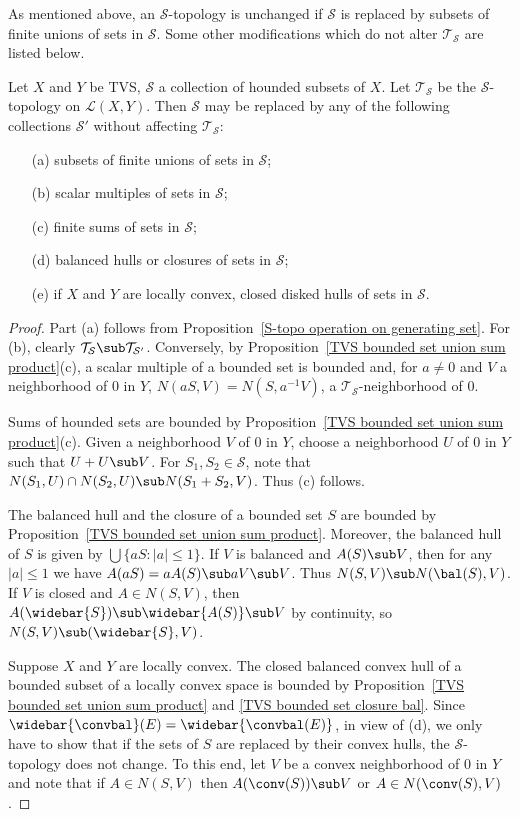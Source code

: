 As mentioned above, an $\mathcal{S}$-topology is unchanged if $\mathcal{S}$ is replaced by subsets of finite unions of sets in $\mathcal{S}$. Some other modifications which do not alter $\mathcal{T}_\mathcal{S}$ are listed below.
\begin{proposition}\label{S-topo on L(X,Y) operation on S}
Let $X$ and $Y$ be TVS, $\mathcal{S}$ a collection of hounded subsets of $X$. Let $\mathcal{T}_\mathcal{S}$ be the $\mathcal{S}$-topology on $\mathcal{L}(X,Y)$. Then $\mathcal{S}$ may be replaced by any of the following collections $\mathcal{S}'$ without affecting $\mathcal{T}_\mathcal{S}$:
\begin{itemize}
\item[(a)] subsets of finite unions of sets in $\mathcal{S}$;
\item[(b)] scalar multiples of sets in $\mathcal{S}$;
\item[(c)] finite sums of sets in $\mathcal{S}$;
\item[(d)] balanced hulls or closures of sets in $\mathcal{S}$;
\item[(e)] if $X$ and $Y$ are locally convex, closed disked hulls of sets in $\mathcal{S}$.
\end{itemize}
\end{proposition}
\begin{proof}
Part (a) follows from Proposition~\ref{S-topo operation on generating set}. For (b), clearly $\mathcal{T}_\mathcal{S}\sub\mathcal{T}_{\mathcal{S}'}$. Conversely, by Proposition~\ref{TVS bounded set union sum product}(c), a scalar multiple of a bounded set is bounded and, for $a\neq 0$ and $V$ a neighborhood of $0$ in $Y$, $N(aS,V)=N(S,a^{-1}V)$, a $\mathcal{T}_\mathcal{S}$-neighborhood of $0$.\par
Sums of hounded sets are bounded by Proposition~\ref{TVS bounded set union sum product}(c). Given a neighborhood $V$ of $0$ in $Y$, choose a neighborhood $U$ of $0$ in $Y$ such that $U+U\sub V$. For $S_1,S_2\in\mathcal{S}$, note that $N(S_1,U)\cap N(S_2,U)\sub N(S_1+S_2,V)$. Thus (c) follows.\par
The balanced hull and the closure of a bounded set $S$ are bounded by Proposition~\ref{TVS bounded set union sum product}. Moreover, the balanced hull of $S$ is given by $\bigcup\{aS:|a|\leq 1\}$. If $V$ is balanced and $A(S)\sub V$, then for any $|a|\leq 1$ we have $A(aS)=aA(S)\sub aV\sub V$. Thus $N(S,V)\sub N(\bal(S),V)$. If $V$ is closed and $A\in N(S,V)$, then $A(\widebar{S})\sub\widebar{A(S)}\sub V$ by continuity, so $N(S,V)\sub(\widebar{S},V)$.\par
Suppose $X$ and $Y$ are locally convex. The closed balanced convex hull of a bounded subset of a locally convex space is bounded by Proposition~\ref{TVS bounded set union sum product} and \ref{TVS bounded set closure bal}. Since $\widebar{\convbal}(E)=\widebar{\convbal(E)}$, in view of (d), we only have to show that if the sets of $S$ are replaced by their convex hulls, the $\mathcal{S}$-topology does not change. To this end, let $V$ be a convex neighborhood of $0$ in $Y$ and note that if $A\in N(S,V)$ then $A (\conv(S))\sub V$ or $A\in N(\conv(S),V)$.
\end{proof}
